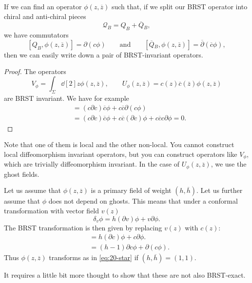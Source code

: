 \begin{claim}
  If we can find an operator $\phi(z, \overline{z}{})$ such that, if we split our BRST operator into chiral and anti-chiral pieces
  \begin{equation}
    \mathcal{Q}_B = Q_B + \overline{Q}{}_B,
  \end{equation}
  we have commutators
  \begin{equation}
    \label{eq:20-star}
    [Q_B, \phi(z, \overline{z}{})] = \partial(c \phi) \qquad \text{and} \qquad [\overline{Q}{}_B, \phi(z, \overline{z}{})] = \overline{\partial}{} (\overline{c}{}\phi),
  \end{equation}
  then we can easily write down a pair of BRST-invariant operators.
\end{claim}
\begin{proof}
  The operators
  \begin{equation}
    V_{\phi} = \int_{\Sigma} \dd[2]{z} \phi(z, \overline{z}{}),
    \qquad
    U_{\phi}(z, \overline{z}{}) = c(z) \overline{c}{}(\overline{z}{}) \phi(z, \overline{z}{})
  \end{equation}
  are BRST invariant.
  We have for example
  \begin{align}
    [Q_B, U_{\phi}] &= (c \partial c) \overline{c}{} \phi + c \overline{c}{} \partial(c \phi) \\
		    &= (c \partial c) \overline{c}{} \phi + c \overline{c}{} (\partial c) \phi + c \overline{c}{} c \partial \phi = 0.
  \end{align}
\end{proof}
\begin{remark}
  Note that one of them is local and the other non-local.
  You cannot construct local diffeomorphism invariant operators, but you can construct operators like $V_\phi$, which are trivially diffeomorphism invariant.
  In the case of $U_\phi(z, \overline{z}{})$, we use the ghost fields.
\end{remark}

Let us assume that $\phi(z, \overline{z}{})$ is a primary field of weight $(h, \overline{h})$. 
Let us further assume that $\phi$ does not depend on ghosts.
This means that under a conformal transformation with vector field $v(z)$
\begin{equation}
  \delta_v \phi = h (\partial v) \phi + v \partial \phi.
\end{equation}
The BRST transformation is then given by replacing $v(z)$ with $c(z)$:
\begin{align}
  [Q_B, \phi] &= h (\partial c) \phi + c \partial \phi. \\
	      &= (h - 1) \partial c \phi + \partial (c \phi).
\end{align}
Thus $\phi(z, \overline{z}{})$ transforms as in \eqref{eq:20-star} if $(h, \overline{h}{}) = (1, 1)$.
\begin{remark}
  It requires a little bit more thought to show that these are not also BRST-exact.
\end{remark}

